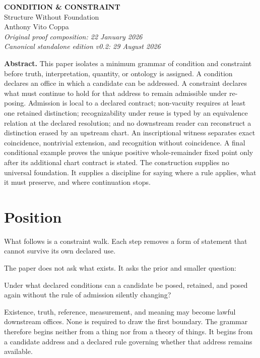 \documentclass[11pt]{article}
\begin{document}
\begin{center}
{\Large\bfseries CONDITION \& CONSTRAINT}\\[3pt]
{\large Structure Without Foundation}\\[8pt]
Anthony Vito Coppa\\[2pt]
\textit{Original proof composition: 22 January 2026}\\
\textit{Canonical standalone edition v0.2: 29 August 2026}
\end{center}

\begin{lawbox}
\textbf{Abstract.}
This paper isolates a minimum grammar of condition and constraint before truth, interpretation, quantity, or ontology is assigned. A condition declares an office in which a candidate can be addressed. A constraint declares what must continue to hold for that address to remain admissible under re-posing. Admission is local to a declared contract; non-vacuity requires at least one retained distinction; recognizability under reuse is typed by an equivalence relation at the declared resolution; and no downstream reader can reconstruct a distinction erased by an upstream chart. An inscriptional witness separates exact coincidence, nontrivial extension, and recognition without coincidence. A final conditional example proves the unique positive whole-remainder fixed point only after its additional chart contract is stated. The construction supplies no universal foundation. It supplies a discipline for saying where a rule applies, what it must preserve, and where continuation stops.
\end{lawbox}

\section{Position}

What follows is a constraint walk. Each step removes a form of statement that cannot survive its own declared use.

The paper does not ask what exists. It asks the prior and smaller question:

\begin{lawbox}
\centering
Under what declared conditions can a candidate be posed, retained, and posed again without the rule of admission silently changing?
\end{lawbox}

Existence, truth, reference, measurement, and meaning may become lawful downstream offices. None is required to draw the first boundary. The grammar therefore begins neither from a thing nor from a theory of things. It begins from a candidate address and a declared rule governing whether that address remains available.
\end{document}
